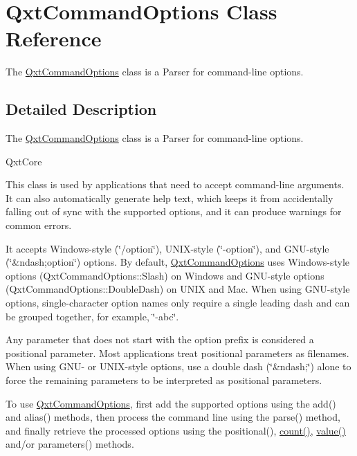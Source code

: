 \hypertarget{class_qxt_command_options}{\section{Qxt\-Command\-Options Class Reference}
\label{class_qxt_command_options}
}


The \hyperlink{class_qxt_command_options}{Qxt\-Command\-Options} class is a Parser for command-\/line options.  




\subsection{Detailed Description}
The \hyperlink{class_qxt_command_options}{Qxt\-Command\-Options} class is a Parser for command-\/line options. 

Qxt\-Core

This class is used by applications that need to accept command-\/line arguments. It can also automatically generate help text, which keeps it from accidentally falling out of sync with the supported options, and it can produce warnings for common errors.

It accepts Windows-\/style (\char`\"{}/option\char`\"{}), U\-N\-I\-X-\/style (\char`\"{}-\/option\char`\"{}), and G\-N\-U-\/style (\char`\"{}\&ndash;option\char`\"{}) options. By default, \hyperlink{class_qxt_command_options}{Qxt\-Command\-Options} uses Windows-\/style options (Qxt\-Command\-Options\-::\-Slash) on Windows and G\-N\-U-\/style options (Qxt\-Command\-Options\-::\-Double\-Dash) on U\-N\-I\-X and Mac. When using G\-N\-U-\/style options, single-\/character option names only require a single leading dash and can be grouped together, for example, \char`\"{}-\/abc\char`\"{}.

Any parameter that does not start with the option prefix is considered a positional parameter. Most applications treat positional parameters as filenames. When using G\-N\-U-\/ or U\-N\-I\-X-\/style options, use a double dash (\char`\"{}\&ndash;\char`\"{}) alone to force the remaining parameters to be interpreted as positional parameters.

To use \hyperlink{class_qxt_command_options}{Qxt\-Command\-Options}, first add the supported options using the add() and alias() methods, then process the command line using the parse() method, and finally retrieve the processed options using the positional(), \hyperlink{glext_8h_a5b40aca7a9682963dd00a8f5aef0a901}{count()}, \hyperlink{glext_8h_aa0e2e9cea7f208d28acda0480144beb0}{value()} and/or parameters() methods.

